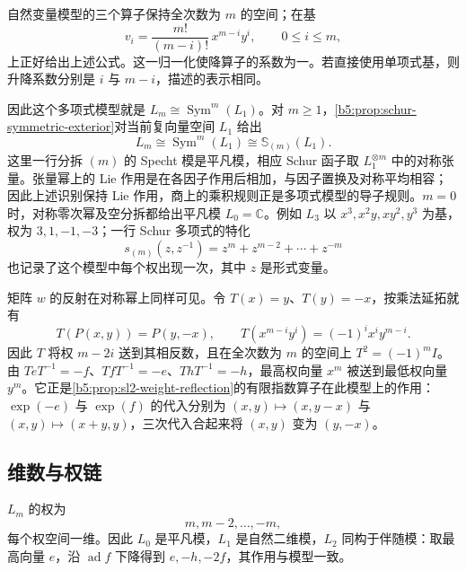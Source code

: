 \ProseParagraphBreak

自然变量模型的三个算子保持全次数为 \(m\) 的空间；在基
\[
	v_i=\frac{m!}{(m-i)!}\,x^{m-i}y^i,\qquad 0\le i\le m,
\]
上正好给出上述公式。这一归一化使降算子的系数为一。若直接使用单项式基，则升降系数分别是 \(i\) 与 \(m-i\)，描述的表示相同。

\ProseParagraphBreak

因此这个多项式模型就是 \(L_m\cong\operatorname{Sym}^m(L_1)\)。对 \(m\ge1\)，\cref{b5:prop:schur-symmetric-exterior}对当前复向量空间 \(L_1\) 给出
\[
	L_m\cong\operatorname{Sym}^m(L_1)\cong\mathbb S_{(m)}(L_1).
\]
这里一行分拆 \((m)\) 的 Specht 模是平凡模，相应 Schur 函子取 \(L_1^{\otimes m}\) 中的对称张量。张量幂上的 Lie 作用是在各因子作用后相加，与因子置换及对称平均相容；因此上述识别保持 Lie 作用，商上的乘积规则正是多项式模型的导子规则。\(m=0\) 时，对称零次幂及空分拆都给出平凡模 \(L_0=\mathbb C\)。例如 \(L_3\) 以 \(x^3,x^2y,xy^2,y^3\) 为基，权为 \(3,1,-1,-3\)；一行 Schur 多项式的特化
\[
	s_{(m)}(z,z^{-1})=z^m+z^{m-2}+\cdots+z^{-m}
\]
也记录了这个模型中每个权出现一次，其中 \(z\) 是形式变量。

\ProseParagraphBreak

矩阵 \(w\) 的反射在对称幂上同样可见。令 \(T(x)=y\)、\(T(y)=-x\)，按乘法延拓就有
\[
	T(P(x,y))=P(y,-x),\qquad T(x^{m-i}y^i)=(-1)^i x^iy^{m-i}.
\]
因此 \(T\) 将权 \(m-2i\) 送到其相反数，且在全次数为 \(m\) 的空间上 \(T^2=(-1)^mI\)。由 \(TeT^{-1}=-f\)、\(TfT^{-1}=-e\)、\(ThT^{-1}=-h\)，最高权向量 \(x^m\) 被送到最低权向量 \(y^m\)。它正是\cref{b5:prop:sl2-weight-reflection}的有限指数算子在此模型上的作用：\(\exp(-e)\) 与 \(\exp(f)\) 的代入分别为 \((x,y)\mapsto(x,y-x)\) 与 \((x,y)\mapsto(x+y,y)\)，三次代入合起来将 \((x,y)\) 变为 \((y,-x)\)。

\subsection{维数与权链}
\label{b5:subsec:1402:03}

\(L_m\) 的权为
\[
	m,m-2,\ldots,-m,
\]
每个权空间一维。因此 \(L_0\) 是平凡模，\(L_1\) 是自然二维模，\(L_2\) 同构于伴随模：取最高向量 \(e\)，沿 \(\operatorname{ad}f\) 下降得到 \(e,-h,-2f\)，其作用与模型一致。

\ProseParagraphBreak

